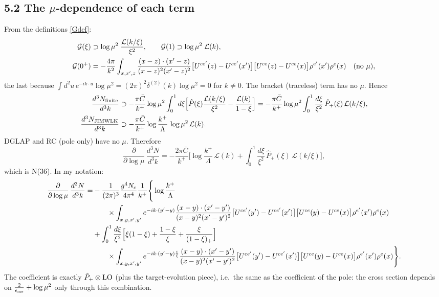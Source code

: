 \documentclass[10pt]{article}
\numberwithin{equation}{section}
\newcommand{\Wop}[2]{\big[U^{ce'}(#2)-U^{ce'}(x')\big]\big[U^{ce}(#1)-U^{ce}(x)\big]\rho^{e'}(x')\rho^{e}(x)}
\newcommand{\Kx}[2]{\frac{(x-#1)\cdot(x'-#2)}{(x-#1)^{2}(x'-#2)^{2}}}
\newcommand{\Cb}{\bar C}
\newcommand{\Ph}{\hat P}
\newcommand{\Lc}{\mathcal L}
\begin{document}
\subsection*{5.2 The $\mu$-dependence of each term}
From the definitions \eqref{Gdef}:
\begin{align}
\mathcal G(\xi)&\supset\log\mu^2\;\frac{\Lc(k/\xi)}{\xi^2},\qquad
\mathcal G(1)\supset\log\mu^2\;\Lc(k),\notag\\
\mathcal G(0^+)&=-\frac{4\pi}{k^2}\int_{x,x',z}\Kx{z}{z}\Wop{z}{z}\quad(\text{no }\mu),
\end{align}
the last because $\int d^2u\,e^{-ik\cdot u}\log\mu^2=(2\pi)^2\delta^{(2)}(k)\log\mu^2=0$ for $k\neq0$. The bracket
(traceless) term has no $\mu$. Hence
\begin{align}
\frac{d^3N_{\rm finite}}{d^3k}&\supset-\frac{\pi\Cb}{k^+}\log\mu^2\int_0^1d\xi\Big[\Ph(\xi)\frac{\Lc(k/\xi)}{\xi^2}-\frac{\Lc(k)}{1-\xi}\Big]
=-\frac{\pi\Cb}{k^+}\log\mu^2\int_0^1\frac{d\xi}{\xi^2}\,\Ph_+(\xi)\,\Lc(k/\xi),\\
\frac{d^3N_{\rm JIMWLK}}{d^3k}&\supset-\frac{\pi\Cb}{k^+}\log\frac{k^+}{\Lambda}\,\log\mu^2\,\Lc(k).
\end{align}
DGLAP and RC (pole only) have no $\mu$. Therefore
\begin{equation}
\frac{\partial}{\partial\log\mu}\,\frac{d^3N}{d^3k}=-\frac{2\pi\Cb}{k^+}\Big[\log\frac{k^+}{\Lambda}\,\Lc(k)+\int_0^1\frac{d\xi}{\xi^2}\,\Ph_+(\xi)\,\Lc(k/\xi)\Big],
\end{equation}
which is N(36). In my notation:
\begin{align}
\frac{\partial}{\partial\log\mu}\,\frac{d^3N}{d^3k}=&-\frac{1}{(2\pi)^3}\frac{g^4N_c}{4\pi^4}\frac{1}{k^+}\Bigg\{\log\frac{k^+}{\Lambda}\notag\\
&\qquad\times\int_{x,y,x',y'}e^{-ik\cdot(y'-y)}\Kx{y}{y'}\Wop{y}{y'}\notag\\
&+\int_0^1\frac{d\xi}{\xi^2}\Big[\xi(1-\xi)+\frac{1-\xi}{\xi}+\frac{\xi}{(1-\xi)_+}\Big]\notag\\
&\qquad\times\int_{x,y,x',y'}e^{-ik\cdot(y'-y)\frac1\xi}\Kx{y}{y'}\Wop{y}{y'}\Bigg\}.
\end{align}
The coefficient is exactly $\Ph_+\otimes{\rm LO}$ (plus the target-evolution piece), i.e.\ the same as the coefficient of
the pole: the cross section depends on $\frac{2}{\epsilon_{\rm me}}+\log\mu^2$ only through this combination.
\end{document}
